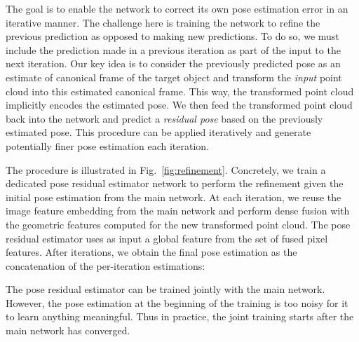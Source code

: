 \documentclass[10pt,twocolumn,letterpaper]{article}
\begin{document}
The goal is to enable the network to correct its own pose estimation error in an iterative manner. The challenge here is training the network to refine the previous prediction as opposed to making new predictions. To do so, we must include the prediction made in a previous iteration as part of the input to the next iteration. Our key idea is to consider the previously predicted pose as an estimate of canonical frame of the target object and transform the \textit{input} point cloud into this estimated canonical frame.  This way, the transformed point cloud implicitly encodes the estimated pose. We then feed the transformed point cloud back into the network and predict a \textit{residual pose} based on the previously estimated pose.  This procedure can be applied iteratively and generate potentially finer pose estimation each iteration. 

The procedure is illustrated in Fig.~\ref{fig:refinement}. Concretely, we train a dedicated pose residual estimator network to perform the refinement given the initial pose estimation from the main network. At each iteration, we reuse the image feature embedding from the main network and perform dense fusion with the geometric features computed for the new transformed point cloud. The pose residual estimator uses as input a global feature from the set of fused pixel features. After  iterations, we obtain the final pose estimation as the concatenation of the per-iteration estimations:


The pose residual estimator can be trained jointly with the main network. However, the pose estimation at the beginning of the training is too noisy for it to learn anything meaningful. Thus in practice, the joint training starts after the main network has converged.
\end{document}
